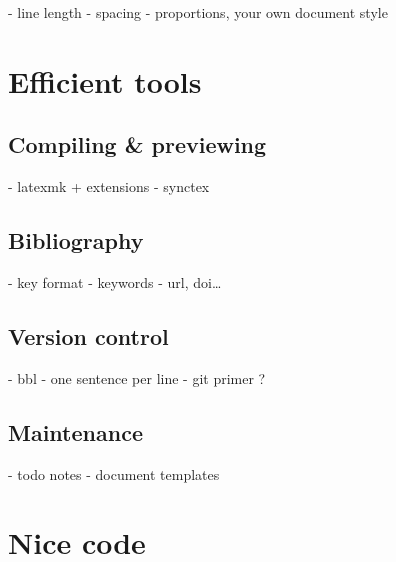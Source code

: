 \documentclass[a4paper,twoside,nofonts]{tufte-handout}
\begin{document}
\begin{todoenv}
    - line length
    - spacing
    - proportions, your own document style
\end{todoenv}



\section{Efficient tools} %
\label{sec:tools}

\subsection{Compiling \& previewing} %
\label{sub:compiling}

\begin{todoenv}
    - latexmk + extensions
    - synctex
\end{todoenv}

\subsection{Bibliography} %
\label{sub:bibliography}

\begin{todoenv}
    - key format
    - keywords
    - url, doi…
\end{todoenv}

\subsection{Version control} %
\label{sub:vcs}

\begin{todoenv}
    - bbl
    - one sentence per line
    - git primer ?
\end{todoenv}

\subsection{Maintenance} %
\label{sub:maintenance}

\begin{todoenv}
    - todo notes
    - document templates
\end{todoenv}



\section{Nice code} %
\label{sec:code}
\end{document}
